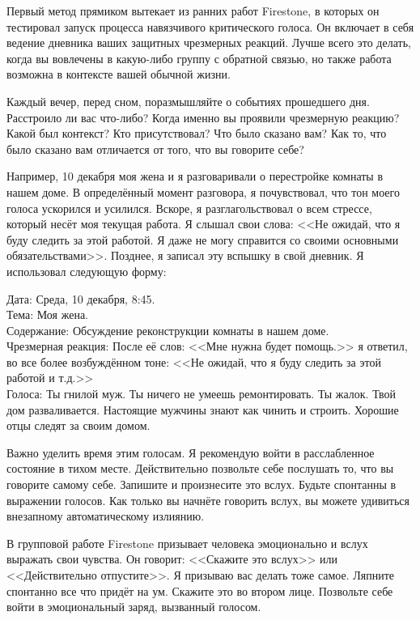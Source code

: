 \documentclass[10pt, fleqn]{article}
\begin{document}
Первый метод прямиком вытекает из ранних работ Firestone, в которых он тестировал запуск процесса навязчивого критического голоса. Он включает в себя ведение дневника ваших защитных чрезмерных реакций. Лучше всего это делать, когда вы вовлечены в какую-либо группу с обратной связью, но также работа возможна в контексте вашей обычной жизни.

Каждый вечер, перед сном, поразмышляйте о событиях прошедшего дня. Расстроило ли вас что-либо? Когда именно вы проявили чрезмерную реакцию? Какой был контекст? Кто присутствовал? Что было сказано вам? Как то, что было сказано вам отличается от того, что вы говорите себе?

Например, 10 декабря моя жена и я разговаривали о перестройке комнаты в нашем доме. В определённый момент разговора, я почувствовал, что тон моего голоса ускорился и усилился. Вскоре, я разглагольствовал о всем стрессе, который несёт моя текущая работа. Я слышал свои слова: <<Не ожидай, что я буду следить за этой работой. Я даже не могу справится со своими основными обязательствами>>. Позднее, я записал эту вспышку в свой дневник.
Я использовал следующую форму:

Дата: Среда, 10 декабря, 8:45.\\
Тема: Моя жена.\\
Содержание: Обсуждение реконструкции комнаты в нашем доме.\\
Чрезмерная реакция: После её слов: <<Мне нужна будет помощь.>> я ответил, во все более возбуждённом тоне: <<Не ожидай, что я буду следить за этой работой и т.д.>>\\
Голоса: Ты гнилой муж. Ты ничего не умеешь ремонтировать. Ты жалок. Твой дом разваливается. Настоящие мужчины знают как чинить и строить. Хорошие отцы следят за своим домом.

Важно уделить время этим голосам. Я рекомендую войти в расслабленное состояние в тихом месте. Действительно позвольте себе послушать то, что вы говорите самому себе. Запишите и произнесите это вслух. Будьте спонтанны в выражении голосов. Как только вы начнёте говорить вслух, вы можете удивиться внезапному автоматическому излиянию.

В групповой работе Firestone призывает человека эмоционально и вслух выражать свои чувства. Он говорит: <<Скажите это вслух>> или <<Действительно отпустите>>. Я призываю вас делать тоже самое. Ляпните спонтанно все что придёт на ум. Скажите это во втором лице. Позвольте себе войти в эмоциональный заряд, вызванный голосом.


\end{document}
